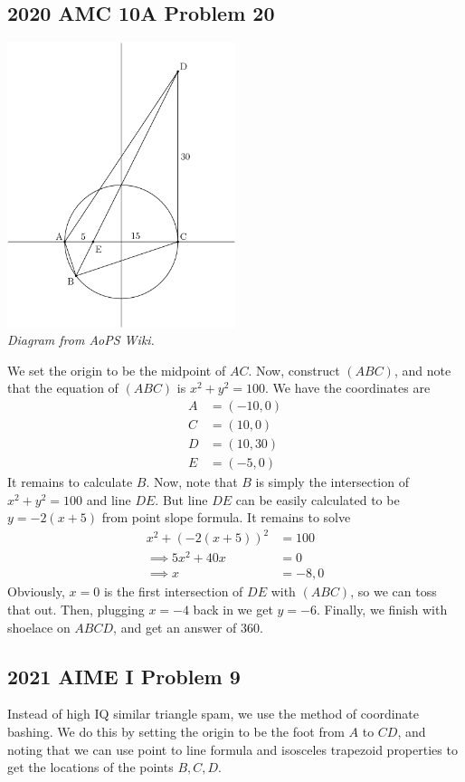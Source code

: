 \documentclass{article}
\begin{document}
\subsection{2020 AMC 10A Problem 20}
\begin{center}
    \includegraphics[width = 0.5\textwidth]{amc2020.png}\\
    \textit{Diagram from AoPS Wiki.}
\end{center}
We set the origin to be the midpoint of $AC$. Now, construct $(ABC)$, and note that the equation of $(ABC)$ is $x^2+y^2=100$. We have the coordinates are
\begin{align*}
    A&=(-10,0)\\
    C&=(10,0)\\
    D&=(10,30)\\
    E&=(-5,0)
\end{align*}
It remains to calculate $B$. Now, note that $B$ is simply the intersection of $x^2+y^2=100$ and line $DE$. But line $DE$ can be easily calculated to be $y=-2(x+5)$ from point slope formula. It remains to solve 
\begin{align*}
    x^2+(-2(x+5))^2&=100\\
    \implies 5x^2+40x&=0\\
    \implies x&=-8,0
\end{align*}
Obviously, $x=0$ is the first intersection of $DE$ with $(ABC)$, so we can toss that out. Then, plugging $x=-4$ back in we get $y=-6$. Finally, we finish with shoelace on $ABCD$, and get an answer of $\boxed{360}$.

\subsection{2021 AIME I Problem 9}
Instead of high IQ similar triangle spam, we use the method of coordinate bashing. We do this by setting the origin to be the foot from $A$ to $CD$, and noting that we can use point to line formula and isosceles trapezoid properties to get the locations of the points $B,C,D$. 
\end{document}

